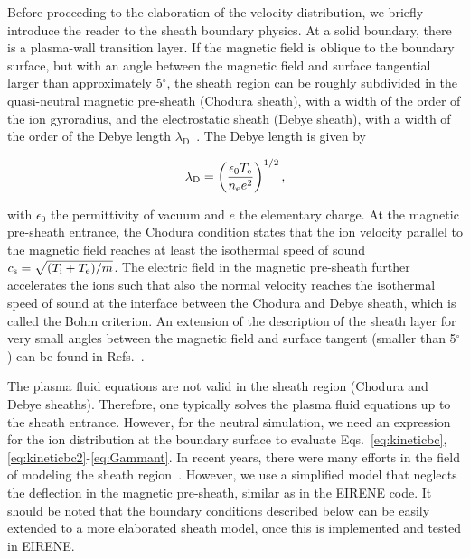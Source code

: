 Before proceeding to the elaboration of the velocity distribution, we briefly introduce the reader to the sheath boundary physics. At a solid boundary, there is a plasma-wall transition layer. If the magnetic field is oblique to the boundary surface, but with an angle between the magnetic field and surface tangential larger than approximately 5$^{\circ}$, the sheath region can be roughly subdivided in the quasi-neutral magnetic pre-sheath (Chodura sheath), with a width of the order of the ion gyroradius, and the electrostatic sheath (Debye sheath), with a width of the order of the Debye length $\lambda_{\mathrm{D}}$~\cite{chodura1982plasma,stangeby2012chodura}. The Debye length is given by

\begin{equation}
\lambda_{\mathrm{D}} = \left (\frac{\epsilon_{0} T_{\mathrm{e}}}{n_{\mathrm{e}} e^{2}} \right )^{1/2},
\end{equation}

with $\epsilon_{0}$ the permittivity of vacuum and $e$ the elementary charge. At the magnetic pre-sheath entrance, the Chodura condition states that the ion velocity parallel to the magnetic field reaches at least the isothermal speed of sound $c_{\mathrm{s}} = \sqrt{(T_{\mathrm{i}} + T_{\mathrm{e}})/m}$. The electric field in the magnetic pre-sheath further accelerates the ions such that also the normal velocity reaches the isothermal speed of sound at the interface between the Chodura and Debye sheath, which is called the Bohm criterion. An extension of the description of the sheath layer for very small angles between the magnetic field and surface tangent (smaller than 5$^{\circ}$) can be found in Refs.~\cite{stangeby2012chodura, tskhakaya2005theory, tskhakaya2014comprehensive}.

The plasma fluid equations are not valid in the sheath region (Chodura and Debye sheaths). Therefore, one typically solves the plasma fluid equations up to the sheath entrance. However, for the neutral simulation, we need an expression for the ion distribution at the boundary surface to evaluate Eqs.~\eqref{eq:kineticbc}, \eqref{eq:kineticbc2}-\eqref{eq:Gammant}. In recent years, there were many efforts in the field of modeling the sheath region~\cite{cohen2004sheath, coulette2016kinetic, tskhakaya2014comprehensive}. However, we use a simplified model that neglects the deflection in the magnetic pre-sheath, similar as in the EIRENE code. It should be noted that the boundary conditions described below can be easily extended to a more elaborated sheath model, once this is implemented and tested in EIRENE.

